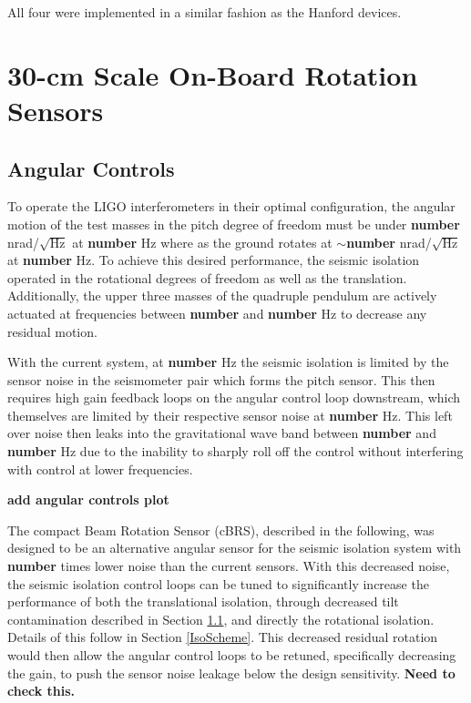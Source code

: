 \documentclass [12pt, proquest]{uwthesis}[2019]
\begin{document}
All four were implemented in a similar fashion as the Hanford devices.

\chapter{30-cm Scale On-Board Rotation Sensors}
\section{Angular Controls}

To operate the LIGO interferometers in their optimal configuration, the angular motion of the test masses in the pitch degree of freedom must be under \textbf{number} nrad/$\sqrt{\text{Hz}}$ at \textbf{number} Hz where as the ground rotates at $\sim$\textbf{number} nrad/$\sqrt{\text{Hz}}$ at \textbf{number} Hz. To achieve this desired performance, the seismic isolation operated in the rotational degrees of freedom as well as the translation. Additionally, the upper three masses of the quadruple pendulum are actively actuated at frequencies between \textbf{number} and \textbf{number} Hz to decrease any residual motion.

With the current system, at \textbf{number} Hz the seismic isolation is limited by the sensor noise in the seismometer pair which forms the pitch sensor. This then requires high gain feedback loops on the angular control loop downstream, which themselves are limited by their respective sensor noise at \textbf{number} Hz. This left over noise then leaks into the gravitational wave band between \textbf{number} and \textbf{number} Hz due to the inability to sharply roll off the control without interfering with control at lower frequencies.

\textbf{add angular controls plot}

The compact Beam Rotation Sensor (cBRS), described in the following, was designed to be an alternative angular sensor for the seismic isolation system with \textbf{number} times lower noise than the current sensors. With this decreased noise, the seismic isolation control loops can be tuned to significantly increase the performance of both the translational isolation, through decreased tilt contamination described in Section \ref{}, and directly the rotational isolation. Details of this follow in Section \ref{IsoScheme}. This decreased residual rotation would then allow the angular control loops to be retuned, specifically decreasing the gain, to push the sensor noise leakage below the design sensitivity. \textbf{Need to check this.}
\end{document}
